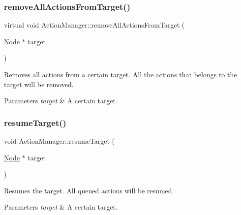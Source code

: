 \subsubsection{\texorpdfstring{remove\+All\+Actions\+From\+Target()}{removeAllActionsFromTarget()}\hspace{0.1cm}{\footnotesize\ttfamily [2/2]}}
{\footnotesize\ttfamily virtual void Action\+Manager\+::remove\+All\+Actions\+From\+Target (\begin{DoxyParamCaption}\item[{\hyperlink{classNode}{Node} $\ast$}]{target }\end{DoxyParamCaption})\hspace{0.3cm}{\ttfamily [virtual]}}

Removes all actions from a certain target. All the actions that belongs to the target will be removed.


\begin{DoxyParams}{Parameters}
{\em target} & A certain target. \\
\hline
\end{DoxyParams}
\mbox{\label{classActionManager_ac65bf5b5a646ca46d2db9fdb5590a0ba}} 
\subsubsection{\texorpdfstring{resume\+Target()}{resumeTarget()}\hspace{0.1cm}{\footnotesize\ttfamily [1/2]}}
{\footnotesize\ttfamily void Action\+Manager\+::resume\+Target (\begin{DoxyParamCaption}\item[{\hyperlink{classNode}{Node} $\ast$}]{target }\end{DoxyParamCaption})}

Resumes the target. All queued actions will be resumed.


\begin{DoxyParams}{Parameters}
{\em target} & A certain target. \\
\hline
\end{DoxyParams}
\mbox{\label{classActionManager_ae36612c0692c514edafa0fce31a04ae1}} 
